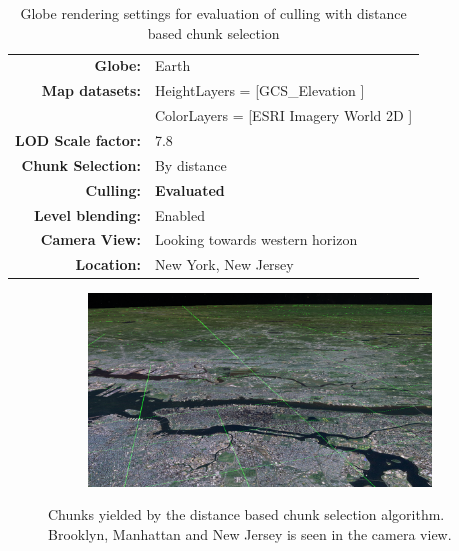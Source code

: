\begin{table}[h]
  \centering
  \caption[]{Globe rendering settings for evaluation of culling with distance based chunk selection}
  \label{table:cullingdsettings}
  \begin{tabular}{| r l |}
    \hline
      \textbf{Globe:}             & Earth \\
      \textbf{Map datasets:}      & HeightLayers = [GCS\_Elevation \cite{worldelevation3d}] \\
                                  & ColorLayers = [ESRI Imagery World 2D \cite{imageryworld2d}] \\
      \textbf{LOD Scale factor:}  & 7.8 \\
      \textbf{Chunk Selection:}    & By distance \\
      \textbf{Culling:}           & \textbf{Evaluated} \\
      \textbf{Level blending:}    & Enabled \\
      \textbf{Camera View:}       & Looking towards western horizon\\
      \textbf{Location:}          & New York, New Jersey\\
    \hline
  \end{tabular}
\end{table}

\begin{figure}[h]
    \centering
    \begin{subfigure}[bt]{1.0\textwidth}
        \includegraphics[width=\textwidth]{figures/results/culling/cam_d.png}
    \end{subfigure}
    \caption{Chunks yielded by the distance based chunk selection algorithm. Brooklyn, Manhattan and New Jersey is seen in the camera view.}
    \label{fig:cullingdcam}
\end{figure}

